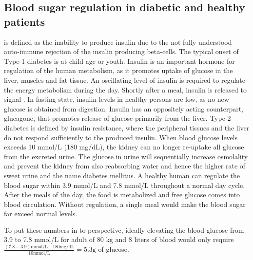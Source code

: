 \subsection{Blood sugar regulation in diabetic and healthy patients}
\DIFdelbegin {}\DIFdelend \DIFaddbegin {}\DIFaddend is defined as the inability to produce insulin due to the not fully understood auto-immune rejection of the insulin producing beta-cells. The typical onset of Type-1 diabetes is at child age or youth. Insulin is an important hormone for regulation of the human metabolism, as it promotes uptake of glucose in the liver, muscles and fat tissue. An oscillating level of insulin is required to regulate the energy metabolism during the day. Shortly after a meal, insulin is released to signal \DIFdelbegin {}\DIFdelend \DIFaddbegin {}\DIFaddend . In fasting state, insulin levels in healthy persons are low, as no new glucose is obtained from digestion. Insulin has an oppositely acting counterpart, glucagone, that promotes release of glucose primarily from the liver. Type-2 diabetes is defined by insulin resistance, where the peripheral tissues and the liver do not respond sufficiently to the \DIFdelbegin {}\DIFdelend \DIFaddbegin {}\DIFaddend produced insulin. When blood glucose levels exceeds 10 mmol/L (180 mg/dL), the kidney can no longer re-uptake all glucose from the excreted urine. The glucose in urine will sequentially increase osmolality and prevent the kidney from also reabsorbing water and hence the higher rate of sweet urine and the name diabetes mellitus. A healthy human can regulate the blood sugar within 3.9 mmol/L and 7.8 mmol/L throughout a normal day cycle. After the meals of the day, the food is metabolized and free glucose comes into blood circulation. Without regulation, a single meal would make the blood sugar far exceed normal levels\cite{silverthorn2010human,Cowart1990}.

To put these numbers in to perspective, ideally elevating the blood glucose from 3.9 to 7.8 mmol/L for adult of 80 kg and 8 liters of blood would only require
$ \frac { (7.8-3.9) \textrm{mmol/L} \quad 180\textrm{mg/dL} }
		{ 10 \textrm{mmol/L} } = 5.3 \textrm{g}$ of glucose.

